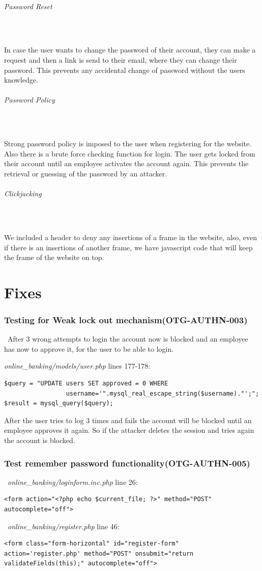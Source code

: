 \documentclass[headsepline,footsepline,footinclude=false,oneside,fontsize=11pt,paper=a4,listof=totoc,bibliography=totoc]{scrbook} %
\begin{document}
\subparagraph{Password Reset}\

In case the user wants to change the password of their account, they can make a request and then a link is send to their email, where they can change their password. This prevents any accidental change of password without the users knowledge.

\subparagraph{Password Policy}\

Strong password policy is imposed to the user when registering for the website. Also there is a brute force checking function for login. The user gets locked from their account until an employee activates the account again. This prevents the retrieval or guessing of the password by an attacker. 

\subparagraph{Clickjacking}\

We included a header to deny any insertions of a frame in the website, also, even if there is an insertions of another frame, we have javascript code that will keep the frame of the website on top.


\chapter{Fixes}

\subsection{Testing for Weak lock out mechanism(OTG-AUTHN-003)}\
After 3 wrong attempts to login the account now is blocked and an employee has now to approve it, for the user to be able to login. \

\textit{online\_banking/models/user.php} lines 177-178:\\

\begin{lstlisting} 
$query = "UPDATE users SET approved = 0 WHERE 
                 username='".mysql_real_escape_string($username)."';"; 
$result = mysql_query($query);
\end{lstlisting} 
After the user tries to log 3 times and fails the account will be blocked until an employee approves it again. So if the attacker deletes the session and tries again the account is blocked.\\

\pagebreak
\subsection{Test remember password functionality(OTG-AUTHN-005)}\
\textit{online\_banking/loginform.inc.php} line 26:
\begin{lstlisting} 
<form action="<?php echo $current_file; ?>" method="POST" autocomplete="off">
\end{lstlisting}\
\textit{online\_banking/register.php} line 46:
\begin{lstlisting} 
<form class="form-horizontal" id="register-form" 
action='register.php' method="POST" onsubmit="return
validateFields(this);" autocomplete="off">
\end{lstlisting} 
\end{document}
